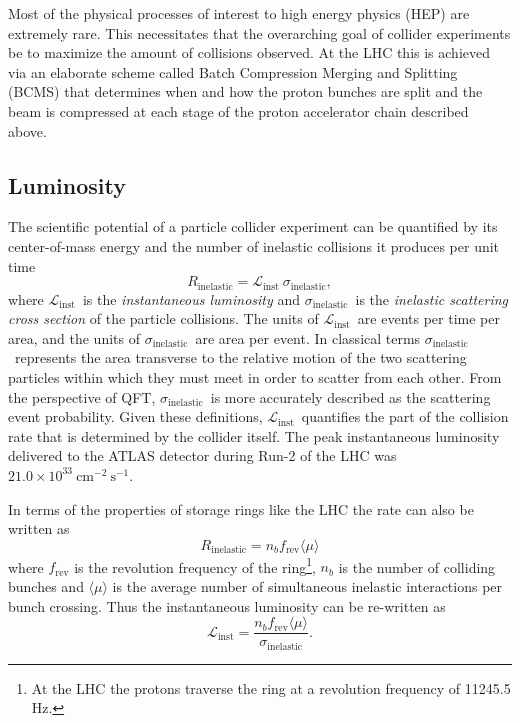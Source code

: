 Most of the physical processes of interest to high energy physics (HEP) are extremely rare.
This necessitates that the overarching goal of collider experiments be to maximize the amount of collisions observed.
At the LHC this is achieved via an elaborate scheme called Batch Compression Merging and Splitting (BCMS) that determines when and how the proton bunches are split and the beam is compressed at each stage of the proton accelerator chain described above.

\subsection{Luminosity}
\newcommand{\CollRate}{\ensuremath{R_{\mathrm{inelastic}}}}
\newcommand{\InstLumi}{\ensuremath{\mathcal{L}_{\mathrm{inst}}}}
\newcommand{\InelXsec}{\ensuremath{\sigma_{\mathrm{inelastic}}}}

The scientific potential of a particle collider experiment can be quantified by its center-of-mass energy and the number of inelastic collisions it produces per unit time
\begin{equation}
\CollRate = \InstLumi\ \InelXsec,
\label{eqn:collision_rate}
\end{equation}
where \InstLumi\ is the \textit{instantaneous luminosity} and \InelXsec\ is the \textit{inelastic scattering cross section} of the particle collisions. The units of \InstLumi\ are events per time per area, and the units of \InelXsec\ are area per event. In classical terms \InelXsec\ represents the area transverse to the relative motion of the two scattering particles within which they must meet in order to scatter from each other. From the perspective of QFT, \InelXsec\ is more accurately described as the scattering event probability. Given these definitions, \InstLumi\ quantifies the part of the collision rate that is determined by the collider itself.
The peak instantaneous luminosity delivered to the ATLAS detector during Run-2 of the LHC was $21.0 \times 10^{33}\ \mathrm{cm}^{-2}\ \mathrm{s}^{-1}$.

In terms of the properties of storage rings like the LHC the rate can also be written as
\begin{equation}
\CollRate = n_b f_{\mathrm{rev}} \langle \mu \rangle
\label{eqn:collision_rate_beam}
\end{equation}
where $f_{\mathrm{rev}}$ is the revolution frequency of the ring\footnote{At the LHC the protons traverse the ring at a revolution frequency of 11245.5 Hz.}, $n_b$ is the number of colliding bunches and $\langle \mu \rangle$ is the average number of simultaneous inelastic interactions per bunch crossing.
Thus the instantaneous luminosity can be re-written as
\begin{equation}
\InstLumi = \frac{n_b f_{\mathrm{rev}} \langle \mu \rangle}{\InelXsec}.
\label{eqn:inst_lumi_ring}
\end{equation}


